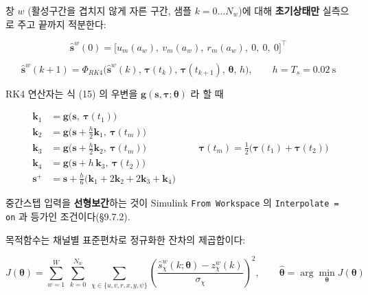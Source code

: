 \documentclass[10pt,a4paper]{article}
\begin{document}
창 $w$ (활성구간을 겹치지 않게 자른 구간, 샘플 $k = 0 \ldots N_w$)에 대해 \textbf{초기상태만} 실측으로 주고 끝까지 적분한다:

\begin{equation*}
\hat{\mathbf{s}}^w(0) = \big[u_m(a_w),\ v_m(a_w),\ r_m(a_w),\ 0,\ 0,\ 0\big]^\top \tag{29}
\end{equation*}

\begin{equation*}
\hat{\mathbf{s}}^w(k{+}1) = \Phi_{RK4}\!\big(\hat{\mathbf{s}}^w(k),\,
\boldsymbol{\tau}(t_k),\, \boldsymbol{\tau}(t_{k+1}),\, \boldsymbol{\theta},\, h\big),
\qquad h = T_s = 0.02\ \text{s} \tag{30}
\end{equation*}

RK4 연산자는 식 (15) 의 우변을 $\mathbf{g}(\mathbf{s}, \boldsymbol{\tau}; \boldsymbol{\theta})$ 라 할 때

\begin{equation*}
\begin{aligned}
\mathbf{k}_1 &= \mathbf{g}\big(\mathbf{s},\ \boldsymbol{\tau}(t_1)\big) \\
\mathbf{k}_2 &= \mathbf{g}\big(\mathbf{s} + \tfrac{h}{2}\mathbf{k}_1,\ \boldsymbol{\tau}(t_m)\big) \\
\mathbf{k}_3 &= \mathbf{g}\big(\mathbf{s} + \tfrac{h}{2}\mathbf{k}_2,\ \boldsymbol{\tau}(t_m)\big) \\
\mathbf{k}_4 &= \mathbf{g}\big(\mathbf{s} + h\,\mathbf{k}_3,\ \boldsymbol{\tau}(t_2)\big) \\
\mathbf{s}^{+} &= \mathbf{s} + \tfrac{h}{6}\big(\mathbf{k}_1 + 2\mathbf{k}_2 + 2\mathbf{k}_3 + \mathbf{k}_4\big)
\end{aligned}
\qquad
\boldsymbol{\tau}(t_m) = \tfrac12\big(\boldsymbol{\tau}(t_1) + \boldsymbol{\tau}(t_2)\big) \tag{31}
\end{equation*}

중간스텝 입력을 \textbf{선형보간}하는 것이 Simulink \texttt{From Workspace} 의 \texttt{Interpolate = on} 과 등가인 조건이다(\S{}9.7.2).

목적함수는 채널별 표준편차로 정규화한 잔차의 제곱합이다:

\begin{equation*}
J(\boldsymbol{\theta}) = \sum_{w=1}^{W}\ \sum_{k=0}^{N_w}\
\sum_{\chi \in \{u,v,r,x,y,\psi\}}
\left(\frac{\hat{s}^w_\chi(k;\boldsymbol{\theta}) - z^w_\chi(k)}{\sigma_\chi}\right)^{\!2},
\qquad
\hat{\boldsymbol{\theta}} = \arg\min_{\boldsymbol{\theta}} J(\boldsymbol{\theta}) \tag{32}
\end{equation*}
\end{document}
